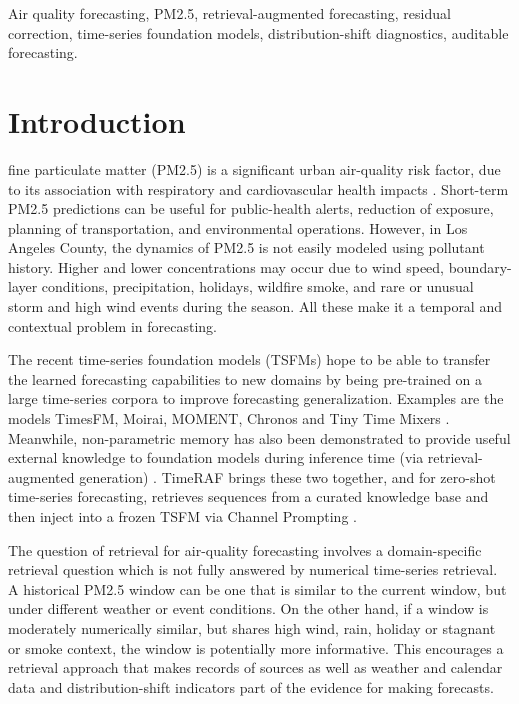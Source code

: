 \documentclass{ieeeaccess}
\begin{document}
\begin{keywords}
Air quality forecasting, PM2.5, retrieval-augmented forecasting, residual correction, time-series foundation models, distribution-shift diagnostics, auditable forecasting.
\end{keywords}

\titlepgskip=-21pt

\maketitle

\section{Introduction}

 fine particulate matter (PM2.5) is a significant urban air-quality risk factor, due to its association with respiratory and cardiovascular health impacts \cite{who2021airquality}. Short-term PM2.5 predictions can be useful for public-health alerts, reduction of exposure, planning of transportation, and environmental operations. However, in Los Angeles County, the dynamics of PM2.5 is not easily modeled using pollutant history. Higher and lower concentrations may occur due to wind speed, boundary-layer conditions, precipitation, holidays, wildfire smoke, and rare or unusual storm and high wind events during the season. All these make it a temporal and contextual problem in forecasting.

The recent time-series foundation models (TSFMs) hope to be able to transfer the learned forecasting capabilities to new domains by being pre-trained on a large time-series corpora to improve forecasting generalization. Examples are the models TimesFM, Moirai, MOMENT, Chronos and Tiny Time Mixers \cite{das2024timesfm,woo2024moirai,goswami2024moment,ansari2024chronos,ekambaram2024ttm}. Meanwhile, non-parametric memory has also been demonstrated to provide useful external knowledge to foundation models during inference time (via retrieval-augmented generation) \cite{lewis2020rag,karpukhin2020dpr}. TimeRAF brings these two together, and for zero-shot time-series forecasting, retrieves sequences from a curated knowledge base and then inject into a frozen TSFM via Channel Prompting \cite{zhang2025timeraf}.

The question of retrieval for air-quality forecasting involves a domain-specific retrieval question which is not fully answered by numerical time-series retrieval. A historical PM2.5 window can be one that is similar to the current window, but under different weather or event conditions. On the other hand, if a window is moderately numerically similar, but shares high wind, rain, holiday or stagnant or smoke context, the window is potentially more informative. This encourages a retrieval approach that makes records of sources as well as weather and calendar data and distribution-shift indicators part of the evidence for making forecasts.
\end{document}
